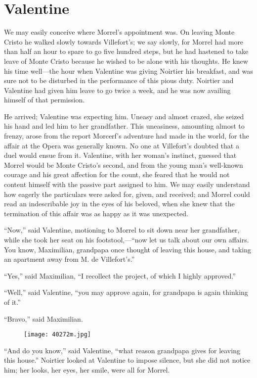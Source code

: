 \chapter{Valentine}

We may easily conceive where Morrel’s appointment was. On leaving Monte
Cristo he walked slowly towards Villefort’s; we say slowly, for Morrel
had more than half an hour to spare to go five hundred steps, but he
had hastened to take leave of Monte Cristo because he wished to be
alone with his thoughts. He knew his time well—the hour when Valentine
was giving Noirtier his breakfast, and was sure not to be disturbed in
the performance of this pious duty. Noirtier and Valentine had given
him leave to go twice a week, and he was now availing himself of that
permission.

He arrived; Valentine was expecting him. Uneasy and almost crazed, she
seized his hand and led him to her grandfather. This uneasiness,
amounting almost to frenzy, arose from the report Morcerf’s adventure
had made in the world, for the affair at the Opera was generally known.
No one at Villefort’s doubted that a duel would ensue from it.
Valentine, with her woman’s instinct, guessed that Morrel would be
Monte Cristo’s second, and from the young man’s well-known courage and
his great affection for the count, she feared that he would not content
himself with the passive part assigned to him. We may easily understand
how eagerly the particulars were asked for, given, and received; and
Morrel could read an indescribable joy in the eyes of his beloved, when
she knew that the termination of this affair was as happy as it was
unexpected.

“Now,” said Valentine, motioning to Morrel to sit down near her
grandfather, while she took her seat on his footstool,—“now let us talk
about our own affairs. You know, Maximilian, grandpapa once thought of
leaving this house, and taking an apartment away from M. de
Villefort’s.”

“Yes,” said Maximilian, “I recollect the project, of which I highly
approved.”

“Well,” said Valentine, “you may approve again, for grandpapa is again
thinking of it.”

“Bravo,” said Maximilian.

\begin{figure}[ht]
\texttt{[image: 40272m.jpg]}
\end{figure}

“And do you know,” said Valentine, “what reason grandpapa gives for
leaving this house.” Noirtier looked at Valentine to impose silence,
but she did not notice him; her looks, her eyes, her smile, were all
for Morrel.

